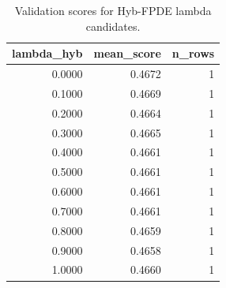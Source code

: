 \begin{table}[t]
\caption{Validation scores for Hyb-FPDE lambda candidates.}
\label{tab:lambda_distribution_computed}
\centering
\begin{tabular}{rrr}
\toprule
lambda\_hyb & mean\_score & n\_rows \\
\midrule
0.0000 & 0.4672 & 1 \\
0.1000 & 0.4669 & 1 \\
0.2000 & 0.4664 & 1 \\
0.3000 & 0.4665 & 1 \\
0.4000 & 0.4661 & 1 \\
0.5000 & 0.4661 & 1 \\
0.6000 & 0.4661 & 1 \\
0.7000 & 0.4661 & 1 \\
0.8000 & 0.4659 & 1 \\
0.9000 & 0.4658 & 1 \\
1.0000 & 0.4660 & 1 \\
\bottomrule
\end{tabular}

\end{table}
